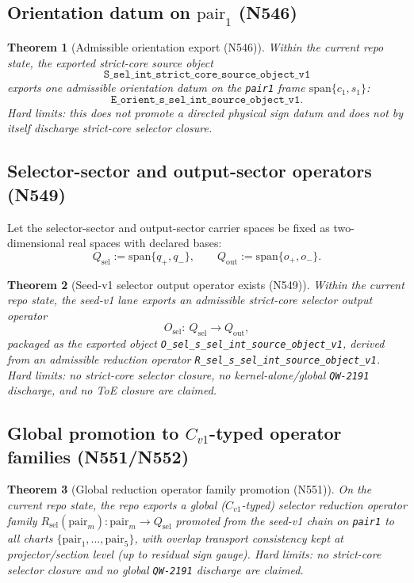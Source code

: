 \documentclass[11pt,a4paper]{article}
\newtheorem{theorem}{Theorem}[section]
\begin{document}
\subsection{Orientation datum on \texorpdfstring{$\mathrm{pair}_1$}{pair1} (N546)}

\begin{theorem}[Admissible orientation export (N546)]
Within the current repo state, the exported strict-core source object
\[
\texttt{S\_sel\_int\_strict\_core\_source\_object\_v1}
\]
exports one admissible orientation datum on the \texttt{pair1} frame $\mathrm{span}\{c_1,s_1\}$:
\[
\texttt{E\_orient\_s\_sel\_int\_source\_object\_v1}.
\]
\emph{Hard limits:} this does not promote a directed physical sign datum and does not by itself discharge strict-core selector closure.
\end{theorem}

\subsection{Selector-sector and output-sector operators (N549)}

Let the selector-sector and output-sector carrier spaces be fixed as two-dimensional real spaces with declared bases:
\[
Q_{\mathrm{sel}}:=\mathrm{span}\{q_+,q_-\},\qquad
Q_{\mathrm{out}}:=\mathrm{span}\{o_+,o_-\}.
\]

\begin{theorem}[Seed-v1 selector output operator exists (N549)]
Within the current repo state, the seed-v1 lane exports an admissible strict-core selector output operator
\[
O_{\mathrm{sel}}:\ Q_{\mathrm{sel}}\to Q_{\mathrm{out}},
\]
packaged as the exported object \texttt{O\_sel\_s\_sel\_int\_source\_object\_v1}, derived from an admissible reduction operator \texttt{R\_sel\_s\_sel\_int\_source\_object\_v1}.
\emph{Hard limits:} no strict-core selector closure, no kernel-alone/global \texttt{QW-2191} discharge, and no ToE closure are claimed.
\end{theorem}

\subsection{Global promotion to \texorpdfstring{$C_{v1}$}{C\_v1}-typed operator families (N551/N552)}

\begin{theorem}[Global reduction operator family promotion (N551)]
On the current repo state, the repo exports a global ($C_{v1}$-typed) selector reduction operator family
$R_{\mathrm{sel}}(\mathrm{pair}_m):\mathrm{pair}_m\to Q_{\mathrm{sel}}$
promoted from the seed-v1 chain on \texttt{pair1} to all charts $\{\mathrm{pair}_1,\dots,\mathrm{pair}_5\}$, with overlap transport consistency kept at projector/section level (up to residual sign gauge).
\emph{Hard limits:} no strict-core selector closure and no global \texttt{QW-2191} discharge are claimed.
\end{theorem}
\end{document}
